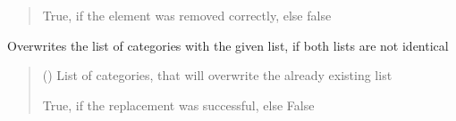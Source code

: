 \documentclass[letterpaper,10pt,english]{sphinxmanual}
\begin{document}
\begin{fulllineitems}
\begin{fulllineitems}
\begin{quote}
\begin{description}
\sphinxAtStartPar
True, if the element was removed correctly, else false

\sphinxAtStartPar
{}

\end{description}\end{quote}

\end{fulllineitems}


\begin{fulllineitems}
\label{\detokenize{apidoc/src.osm_configurator.model.project.configuration:src.osm_configurator.model.project.configuration.category_manager.CategoryManager.override_categories}}
\pysigstartsignatures
{}
\pysigstopsignatures
\sphinxAtStartPar
Overwrites the list of categories with the given list, if both lists are not identical
\begin{quote}\begin{description}
\sphinxAtStartPar
{} () \textendash{} List of categories, that will overwrite the already existing list

\sphinxAtStartPar
True, if the replacement was successful, else False

\sphinxAtStartPar
{}

\end{description}\end{quote}

\end{fulllineitems}



\end{fulllineitems}
\end{document}
